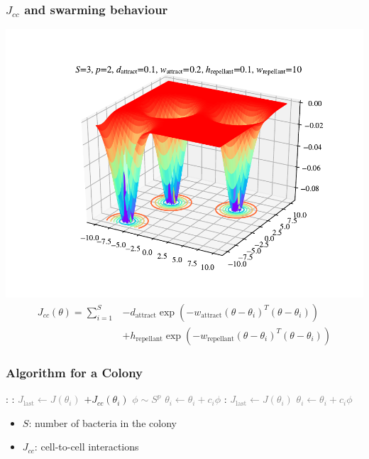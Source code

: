 \documentclass{beamer}
\begin{document}
\begin{frame}
\frametitle{$J_{cc}$ and swarming behaviour}
\begin{center}
\includegraphics[scale=0.35]{assets/swarming}
\begin{align*}
J_{cc}(\theta) = \sum_{i=1}^S &-d_\text{attract} \exp \left( -w_\text{attract} (\theta - \theta_i)^T (\theta - \theta_i) \right) \\ &+ h_\text{repellant} \exp \left( -w_\text{repellant} (\theta - \theta_i)^T (\theta - \theta_i) \right)
\end{align*}
\end{center}
\end{frame}

\begin{frame}
\frametitle{Algorithm for a Colony}
\begin{algorithmic}[1]
\For {\textcolor{gray}{$j \gets 1 \dots N_c $}}:
  :
    \State \textcolor{gray}{$J_\text{last} \gets J(\theta_i) $} $+ J_{cc}(\theta_i)$
    \State \textcolor{gray}{$\phi \sim S^p$}
    \State \textcolor{gray}{$\theta_i \gets \theta_i + c_i \phi$}
    :
      \State \textcolor{gray}{$J_\text{last} \gets J(\theta_i)$}
      \State \textcolor{gray}{$\theta_i \gets \theta_i + c_i \phi$}
    \EndWhile
  \EndFor
\EndFor
\end{algorithmic}
\begin{itemize}
  \item $S$: number of bacteria in the colony
  \item $J_{cc}$: cell-to-cell interactions
\end{itemize}
\end{frame}
\end{document}
